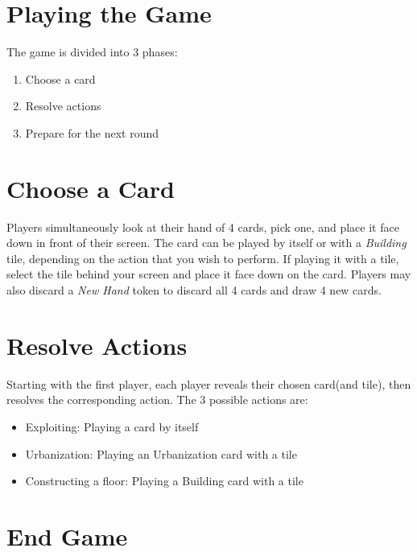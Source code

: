 \documentclass[12pt]{article}
\newenvironment{enumerateCustom}
{\begin{enumerate}
  \setlength{\itemsep}{1pt}
  \setlength{\parskip}{0pt}
  \setlength{\parsep}{0pt}}
{\end{enumerate}}
\newenvironment{itemizeCustom}
{\begin{itemize}
  \setlength{\itemsep}{1pt}
  \setlength{\parskip}{0pt}
  \setlength{\parsep}{0pt}}
{\end{itemize}}
\begin{document}
\begin{mdframed}[style = customFrame]
\begin{multicols*}{2}
\section*{Playing the Game}
The game is divided into 3 phases:
\begin{enumerateCustom}
	\item Choose a card
	\item Resolve actions
	\item Prepare for the next round
\end{enumerateCustom}

\section*{Choose a Card}
Players simultaneously look at their hand of 4 cards, pick one, and place it face down in front of their screen. The card can be played by itself or with a \emph{Building} tile, depending on the action that you wish to perform. If playing it with a tile, select the tile behind your screen and place it face down on the card. Players may also discard a \emph{New Hand} token to discard all 4 cards and draw 4 new cards.

\section*{Resolve Actions}
Starting with the first player, each player reveals their chosen card(and tile), then resolves the corresponding action. The 3 possible actions are:
\begin{itemizeCustom}
	\item Exploiting: Playing a card by itself
	\item Urbanization: Playing an Urbanization card with a tile
	\item Constructing a floor: Playing a Building card with a tile
\end{itemizeCustom}

\section*{End Game}

\end{multicols*}
\end{mdframed}
\end{document}

